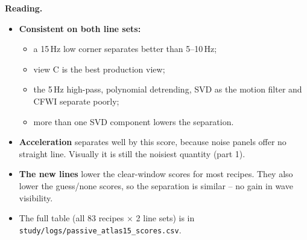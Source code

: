 \documentclass[10pt]{article}
\begin{document}
\textbf{Reading.}
\begin{itemize}
  \item \textbf{Consistent on both line sets:}
    \begin{itemize}
      \item a 15\,Hz low corner separates better than 5--10\,Hz;
      \item view C is the best production view;
      \item the 5\,Hz high-pass, polynomial detrending, SVD as the motion filter and CFWI
        separate poorly;
      \item more than one SVD component lowers the separation.
    \end{itemize}
  \item \textbf{Acceleration} separates well by this score, because noise panels offer no
    straight line. Visually it is still the noisiest quantity (part 1).
  \item \textbf{The new lines} lower the clear-window scores for most recipes. They also lower
    the guess/none scores, so the separation is similar -- no gain in wave visibility.
  \item The full table (all 83 recipes $\times$ 2 line sets) is in
    \texttt{study/logs/passive\_atlas15\_scores.csv}.
\end{itemize}

\clearpage
\end{document}
